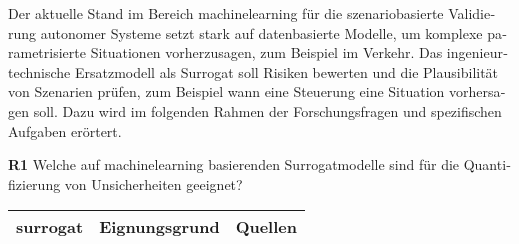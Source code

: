 


\begin{otherlanguage}{ngerman}


Der aktuelle Stand im Bereich \gls{machinelearning} für die szenariobasierte Validierung autonomer Systeme setzt stark auf datenbasierte Modelle, um komplexe parametrisierte Situationen vorherzusagen, zum Beispiel im Verkehr. Das ingenieurtechnische Ersatzmodell als Surrogat soll Risiken bewerten und die Plausibilität von Szenarien prüfen, zum Beispiel wann eine Steuerung eine Situation vorhersagen soll. Dazu wird im folgenden Rahmen der Forschungsfragen und spezifischen Aufgaben erörtert. \par\vspace{1\baselineskip}\noindent


\textbf{R1} Welche auf \gls{machinelearning} basierenden Surrogatmodelle sind für die Quantifizierung von Unsicherheiten geeignet?

\begin{table}[!htpb]
  \centering
  \footnotesize
  \begin{tabularx}{\textwidth}{|l|X|X|}
    \hline
    \textbf{\gls{surrogat}} & \hspace{0.6em}\textbf{Eignungsgrund} & \hspace{0.6em}\textbf{Quellen} \\ \hline
    

\end{tabularx}
\end{table}
\end{otherlanguage}
